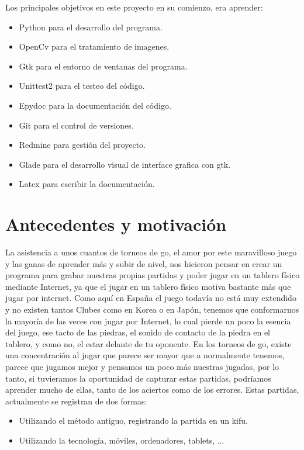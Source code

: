 \documentclass[12pt,a4paper]{report}
\begin{document}
Los principales objetivos en este proyecto en su comienzo, era aprender:
\begin{itemize} 
    \item Python para el desarrollo del programa. 
    \item OpenCv para el tratamiento de imagenes. 
    \item Gtk para el entorno de ventanas del programa. 
    \item Unittest2 para el testeo del código. 
    \item Epydoc para la documentación del código. 
    \item Git para el control de versiones. 
    \item Redmine para gestión del proyecto. 
    \item Glade para el desarrollo visual de interface grafica con gtk.
    \item Latex para escribir la documentación. 
\end{itemize}


\chapter{Antecedentes y motivación}

La asistencia a unos cuantos de torneos de go, el amor por este maravilloso
juego y las ganas de aprender más y subir de nivel, nos hicieron pensar en crear
un programa para grabar nuestras propias partidas y poder jugar en un tablero
físico mediante Internet, ya que el jugar en un tablero físico motiva bastante
más que jugar por internet. Como aquí en España el juego todavía no está muy
extendido y no existen tantos Clubes como en Korea o en Japón, tenemos que
conformarnos la mayoría de las veces con jugar por Internet, lo cual pierde un
poco la esencia del juego, ese tacto de las piedras, el sonido de contacto de la
piedra en el tablero, y como no, el estar delante de tu oponente. 
En los torneos de go, existe una concentración al jugar que parece ser mayor que
a normalmente tenemos, parece que jugamos mejor y pensamos un poco más nuestras
jugadas, por lo tanto, si tuvieramos la oportunidad de capturar estas partidas,
podríamos aprender mucho de ellas, tanto de los aciertos como de los errores. 
Estas partidas, actualmente se registran de dos formas: 
\begin{itemize}
    \item Utilizando el método antiguo, registrando la partida en un kifu. 
    \item Utilizando la tecnología, móviles, ordenadores, tablets, ...
\end{itemize} 
\end{document}
